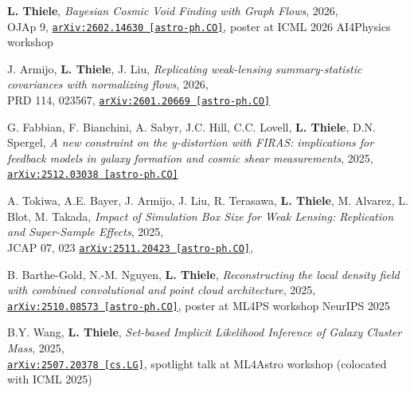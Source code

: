 \begin{minipage}{\textwidth}
{\bf L. Thiele},
\emph{Bayesian Cosmic Void Finding with Graph Flows}, 2026,\\
OJAp 9,
\href{https://arxiv.org/abs/2602.14630}{\mbox{\texttt{arXiv:2602.14630 [astro-ph.CO]}}},
poster at ICML 2026 AI4Physics workshop
\end{minipage}

\begin{minipage}{\textwidth}
J. Armijo, {\bf L. Thiele}, J. Liu,
\emph{Replicating weak-lensing summary-statistic covariances with normalizing flows}, 2026,\\
PRD 114, 023567,
\href{https://arxiv.org/abs/2601.20669}{\mbox{\texttt{arXiv:2601.20669 [astro-ph.CO]}}}
\end{minipage}

\begin{minipage}{\textwidth}
G. Fabbian, F. Bianchini, A. Sabyr, J.C. Hill, C.C. Lovell, {\bf L. Thiele}, D.N. Spergel,
\emph{A new constraint on the y-distortion with FIRAS: implications for feedback models in galaxy formation and cosmic shear measurements}, 2025,\\
\href{https://arxiv.org/abs/2512.03038}{\mbox{\texttt{arXiv:2512.03038 [astro-ph.CO]}}}
\end{minipage}

\begin{minipage}{\textwidth}
A. Tokiwa, A.E. Bayer, J. Armijo, J. Liu, R. Terasawa, {\bf L. Thiele}, M. Alvarez, L. Blot, M. Takada,
\emph{Impact of Simulation Box Size for Weak Lensing: Replication and Super-Sample Effects}, 2025,\\
JCAP 07, 023
\href{https://arxiv.org/abs/2511.20423}{\mbox{\texttt{arXiv:2511.20423 [astro-ph.CO]}}},
\end{minipage}

\begin{minipage}{\textwidth}
B. Barthe-Gold, N.-M. Nguyen, {\bf L. Thiele},
\emph{Reconstructing the local density field with combined convolutional and point cloud architecture}, 2025,\\
\href{https://arxiv.org/abs/2510.08573}{\mbox{\texttt{arXiv:2510.08573 [astro-ph.CO]}}}, poster at ML4PS workshop NeurIPS 2025
\end{minipage}

\begin{minipage}{\textwidth}
B.Y. Wang, {\bf L. Thiele},
\emph{Set-based Implicit Likelihood Inference of Galaxy Cluster Mass}, 2025,\\
\href{https://arxiv.org/abs/2507.20378}{\mbox{\texttt{arXiv:2507.20378 [cs.LG]}}}, spotlight talk at ML4Astro workshop (colocated with ICML 2025)
\end{minipage}

